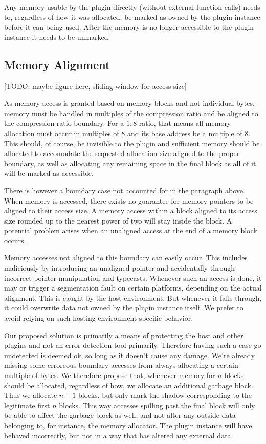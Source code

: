 Any memory usable by the plugin directly (without external function calls) needs
to, regardless of how it was allocated, be marked as owned by the plugin
instance before it can being used.
After the memory is no longer accessible to the plugin instance it needs to be
unmarked.

\subsection {Memory Alignment}

[TODO: maybe figure here, sliding window for access size]

As memory-access is granted based on memory blocks and not individual bytes,
memory must be handled in multiples of the compression ratio and be aligned to
the compression ratio boundary.
For a $1:8$ ratio, that means all memory allocation must occur in multiples of
$8$ and its base address be a multiple of $8$.
This should, of course, be invisible to the plugin and sufficient memory should
be allocated to accomodate the requested allocation size aligned to the proper
boundary, as well as allocating any remaining space in the final block as all of
it will be marked as accessible.

There is however a boundary case not accounted for in the paragraph above.
When memory is accessed, there exists no guarantee for memory pointers to be
aligned to their access size.
A memory access within a block aligned to its access size rounded up to the
nearest power of two will stay inside the block.
A potential problem arises when an unaligned access at the end of a memory block
occurs.

Memory accesses not aligned to this boundary can easily occur.
This includes maliciously by introducing an unaligned pointer and accidentally
through incorrect pointer manipulation and typecasts.
Whenever such an access is done, it may or trigger a segmentation fault on
certain platforms, depending on the actual alignment.
This is caught by the host environment.
But whenever it falls through, it could overwrite data not owned by the plugin
instance itself.
We prefer to avoid relying on such hosting-environment-specific behavior.

Our proposed solution is primarily a means of protecting the host and other
plugins and not an error-detection tool primarily.
Therefore having such a case go undetected is deemed ok, so long as it doesn't
cause any damage.
We're already missing some erroreous boundary accesses from always allocating a
certain multiple of bytes.
We therefore propose that, whenever memory for $n$ blocks should be allocated,
regardless of how, we allocate an additional garbage block. Thus we allocate
$n+1$ blocks, but only mark the shadow corresponding to the legitimate first $n$
blocks.
This way accesses spilling past the final block will only be able to affect the
garbage block as well, and not alter any outside data belonging to, for
instance, the memory allocator.
The plugin instance will have behaved incorrectly, but not in a way that has
altered any external data.

